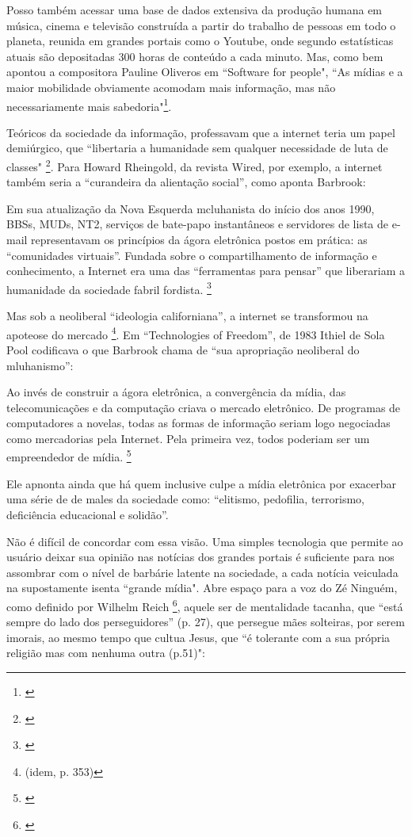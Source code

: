 Posso também acessar uma base de dados extensiva da produção humana em música, cinema e televisão construída a partir do trabalho de pessoas em todo o planeta, reunida em grandes portais como o Youtube, onde segundo estatísticas atuais são depositadas 300 horas de conteúdo a cada minuto. Mas, como bem apontou a compositora Pauline Oliveros em ``Software for people", ``As mídias e a maior mobilidade obviamente acomodam mais informação, mas não necessariamente mais sabedoria"\footnote{\cite[179]{Oliveros2012}}. 

Teóricos da sociedade da informação, professavam que a internet teria um papel demiúrgico, que ``libertaria a humanidade sem qualquer necessidade de luta de classes" \footnote{\cite[275]{Barbrook2009}}. Para Howard Rheingold, da revista Wired, por exemplo, a internet também seria a ``curandeira da alientação social'', como aponta Barbrook:


\begin{citacao}
Em sua atualização da Nova Esquerda mcluhanista do início dos anos 1990, BBSs, MUDs, NT2, serviços de bate-papo instantâneos e servidores de lista de e-mail representavam os princípios da ágora eletrônica postos em prática: as “comunidades virtuais”. Fundada sobre o compartilhamento de informação e conhecimento, a Internet era uma das “ferramentas para pensar” que liberariam a humanidade da sociedade fabril fordista. \footnote{\cite[350]{Barbrook2009}}
\end{citacao}

Mas sob a neoliberal ``ideologia californiana'', a internet se transformou na apoteose do mercado \footnote{(idem, p. 353)}. Em ``Technologies of Freedom'', de 1983 Ithiel de Sola Pool codificava o que Barbrook chama de ``sua apropriação neoliberal do mluhanismo'':
\begin{citacao}
Ao invés de construir a ágora eletrônica, a convergência da mídia, das telecomunicações e da computação criava o mercado eletrônico. De programas de computadores a novelas, todas as formas de informação seriam logo negociadas como mercadorias pela Internet. Pela primeira vez, todos poderiam ser um empreendedor de mídia. \footnote{\cite[348]{Barbrook2009}}
\end{citacao}

Ele apnonta ainda que há quem inclusive culpe a mídia eletrônica por exacerbar uma série de de males da sociedade como: ``elitismo, pedofilia, terrorismo, deficiência educacional e solidão''. 

Não é difícil de concordar com essa visão. Uma simples tecnologia que permite ao usuário deixar sua opinião nas notícias dos grandes portais é suficiente para nos assombrar com o nível de barbárie latente na sociedade, a cada notícia veiculada na supostamente isenta ``grande mídia". Abre espaço para a voz do Zé Ninguém, como definido por Wilhelm Reich \footnote{\cite{reich1998escute}}, aquele ser de mentalidade tacanha, que ``está sempre do lado dos perseguidores'' (p. 27), que persegue mães solteiras, por serem imorais, ao mesmo tempo que cultua Jesus, que ``é tolerante com a sua própria religião mas com nenhuma outra (p.51)":

